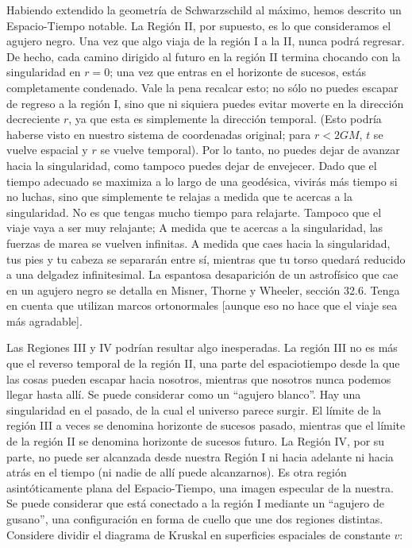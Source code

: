 \documentclass[11pt,b5paper,openany,twoside]{book}
\begin{document}
Habiendo extendido la geometría de Schwarzschild al máximo, hemos descrito un Espacio-Tiempo notable.
La Región II, por supuesto, es lo que consideramos el agujero negro.
Una vez que algo viaja de la región I a la II, nunca podrá regresar.
De hecho, cada camino dirigido al futuro en la región II termina chocando con la singularidad en $r=0$; una vez que entras en el horizonte de sucesos, estás completamente condenado.
Vale la pena recalcar esto; no sólo no puedes escapar de regreso a la región I, sino que ni siquiera puedes evitar moverte en la dirección decreciente $r$, ya que esta es simplemente la dirección temporal.
(Esto podría haberse visto en nuestro sistema de coordenadas original; para $r<2GM$, $t$ se vuelve espacial y $r$ se vuelve temporal).
Por lo tanto, no puedes dejar de avanzar hacia la singularidad, como tampoco puedes dejar de envejecer.
Dado que el tiempo adecuado se maximiza a lo largo de una geodésica, vivirás más tiempo si no luchas, sino que simplemente te relajas a medida que te acercas a la singularidad.
No es que tengas mucho tiempo para relajarte.
Tampoco que el viaje vaya a ser muy relajante; A medida que te acercas a la singularidad, las fuerzas de marea se vuelven infinitas.
A medida que caes hacia la singularidad, tus pies y tu cabeza se separarán entre sí, mientras que tu torso quedará reducido a una delgadez infinitesimal.
La espantosa desaparición de un astrofísico que cae en un agujero negro se detalla en Misner, Thorne y Wheeler, sección 32.6.
Tenga en cuenta que utilizan marcos ortonormales [aunque eso no hace que el viaje sea más agradable].

Las Regiones III y IV podrían resultar algo inesperadas.
La región III no es más que el reverso temporal de la región II, una parte del espaciotiempo desde la que las cosas pueden escapar hacia nosotros, mientras que nosotros nunca podemos llegar hasta allí.
Se puede considerar como un ``agujero blanco''. Hay una singularidad en el pasado, de la cual el universo parece surgir.
El límite de la región III a veces se denomina horizonte de sucesos pasado, mientras que el límite de la región II se denomina horizonte de sucesos futuro.
La Región IV, por su parte, no puede ser alcanzada desde nuestra Región I ni hacia adelante ni hacia atrás en el tiempo (ni nadie de allí puede alcanzarnos).
Es otra región asintóticamente plana del Espacio-Tiempo, una imagen especular de la nuestra.
Se puede considerar que está conectado a la región I mediante un ``agujero de gusano'', una configuración en forma de cuello que une dos regiones distintas.
Considere dividir el diagrama de Kruskal en superficies espaciales de constante $v$:
\end{document}
